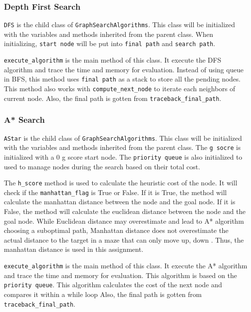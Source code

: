 \documentclass{article}
\begin{document}
\subsubsection{Depth First Search}
\texttt{DFS} is the child class of \texttt{GraphSearchAlgorithms}. 
This class will be initialized with the variables and methods inherited from the parent class. 
When initializing, \texttt{start node} will be put into \texttt{final path} and \texttt{search path}.

\texttt{execute\_algorithm} is the main method of this class. 
It execute the DFS algorithm and trace the time and memory for evaluation.
Instead of using queue in BFS, this method uses \texttt{final path} as a stack to store all the pending nodes.
This method also works with \texttt{compute\_next\_node} to iterate each neighbors of current node.
Also, the final path is gotten from \texttt{traceback\_final\_path}.

\subsubsection{A* Search}
\texttt{AStar} is the child class of \texttt{GraphSearchAlgorithms}.
This class will be initialized with the variables and methods inherited from the parent class. 
The \texttt{g socre} is initialized with a 0 g score start node. The \texttt{priority queue} is also initialized to used to manage nodes during the search based on their total cost.

The \texttt{h\_score} method is used to calculate the heuristic cost of the node. It will check if the \texttt{manhattan\_flag} is True or False.
If it is True, the method will calculate the manhattan distance between the node and the goal node. If it is False, the method will calculate the euclidean distance between the node and the goal node. 
While Euclidean distance may overestimate and lead to A* algorithm choosing a suboptimal path, Manhattan distance does not overestimate the actual distance to the target in a maze that can only move up, down\cite{AStarSearch} \cite{m_and_e}. 
Thus, the manhattan distance is used in this assignment. 

\texttt{execute\_algorithm} is the main method of this class. 
It execute the A* algorithm and trace the time and memory for evaluation.
This algorithm is based on the \texttt{priority queue}. 
This algorithm calculates the cost of the next node and compares it within a while loop
Also, the final path is gotten from \texttt{traceback\_final\_path}.
\end{document}
